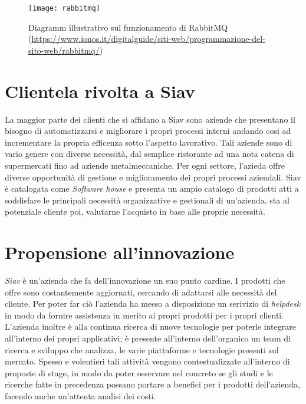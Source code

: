 \begin{figure}[!h] 
	\centering 
	\texttt{[image: rabbitmq]} 
	\caption{Diagramm illustrativo sul funzionamento di RabbitMQ
	(\url{https://www.ionos.it/digitalguide/siti-web/programmazione-del-sito-web/rabbitmq/})}
\end{figure}
\newpage
\section{Clientela rivolta a Siav}
La maggior parte dei clienti che si affidano a Siav sono aziende che presentano il bisogno di automatizzarsi e migliorare i propri processi interni andando cosi ad incrementare la propria efficenza sotto l'aspetto lavorativo. Tali aziende sono di vario genere con diverse necessità, dal semplice ristorante ad una nota catena di supermercati fino ad aziende metalmeccaniche. Per ogni settore, l'azieda offre diverse opportunità di gestione e miglioramento dei propri processi aziendali.
Siav è catalogata come \textit{Software house} e presenta un ampio catalogo di prodotti atti a soddisfare le principali necessità organizzative e gestionali di un'azienda, sta al potenziale cliente poi, valutarne l'acquisto in base alle proprie necessità. 
\section{Propensione all'innovazione}
\textit{Siav} è un'azienda che fa dell'innovazione un suo punto cardine. I prodotti che offre sono costantemente aggiornati, cercando di adattarsi alle necessità del cliente. Per poter far ciò l'azienda ha messo a disposizione un serivizio di \textit{\gls{helpdesk}} in modo da fornire assistenza in merito ai propri prodotti per i propri clienti. L'azienda inoltre è alla continua ricerca di nuove tecnologie per poterle integrare all'interno dei propri applicativi; è presente all'interno dell'organico un team di ricerca e sviluppo che analizza, le varie piattaforme e tecnologie presenti sul mercato. Spesso e volentieri tali attività vengono contestualizzate all'interno di proposte di stage, in modo da poter osservare nel concreto se gli studi e le ricerche fatte in precedenza possano portare a benefici per i prodotti dell'azienda, facendo anche un'attenta analisi dei costi. 